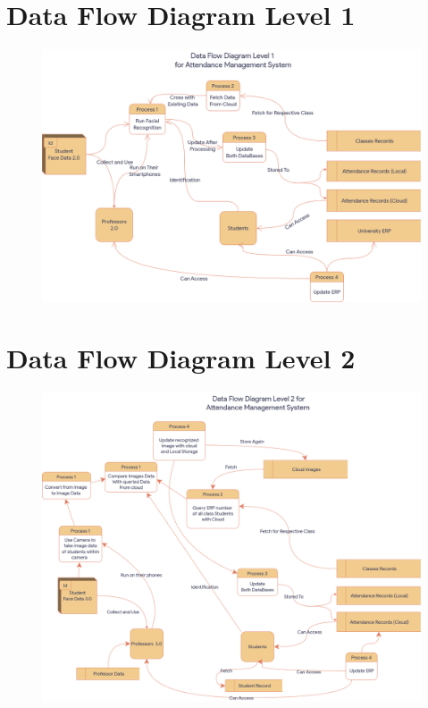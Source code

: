 \documentclass[11pt]{article}
\begin{document}
\section{Data Flow Diagram Level 1}

\begin{figure}[H]
	\begin{small}
		\begin{center}
			\includegraphics[scale=0.45]{Data Flow Diagram-Page-2.drawio.png}
		\end{center}
		\caption{}
		\label{fig:}
	\end{small}
\end{figure}


\section{Data Flow Diagram Level 2}

\begin{figure}[H]
	\begin{small}
		\begin{center}
			\includegraphics[scale=0.40]{Data Flow Diagram-Page-3.drawio.png}
		\end{center}
		\caption{}
		\label{fig:}
	\end{small}
\end{figure}
\end{document}
